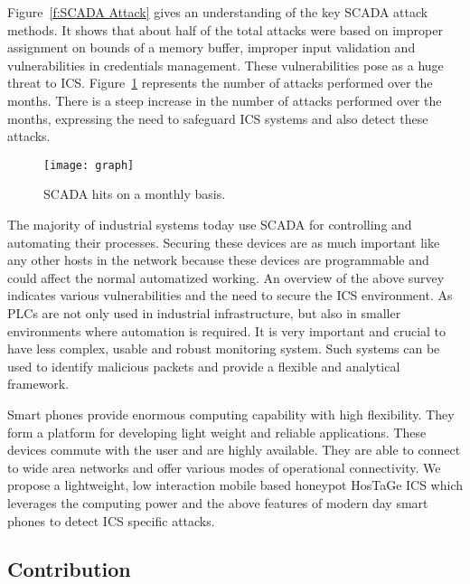 \documentclass[article,msc=informatik,type=msc,colorback,accentcolor=tud9c]{tudthesis}
\begin{document}
            
   \vspace{3mm}         
   Figure~\ref{f:SCADA Attack} gives an understanding of the key \ac{SCADA} attack methods. It shows that about half of the total attacks were based on improper assignment on bounds of a memory buffer, improper input validation and vulnerabilities in credentials management. These vulnerabilities pose as a huge threat to \ac{ICS}. Figure~\ref{f:SCADA Hits} represents the number of attacks performed over the months. There is a steep increase in the number of attacks performed over the months, expressing the need to safeguard \ac{ICS} systems and also detect these attacks.
     
        \begin{figure}[ht]
           \centering
           \texttt{[image: graph]}
           \caption[SCADA Hits]{\label{f:SCADA Hits}SCADA hits on a monthly basis.\cite{DELLSecurityPoster2015}}
           \end{figure} 
     
      
   \vspace{3mm}   
   The majority of industrial systems today use \ac{SCADA} for controlling and automating their processes.
   Securing these devices are as much important like any other hosts in the network because these devices are programmable and could affect the normal automatized working. An overview of the above survey indicates various vulnerabilities and the need to secure the \ac{ICS} environment. As \ac{PLC}s are not only used in industrial infrastructure, but also in smaller environments where automation is required. It is very important and crucial to have less complex, usable and robust monitoring system. Such systems can be used to identify malicious packets and provide a flexible and analytical framework. 
   
   \vspace{3mm}
   Smart phones provide enormous computing capability with high flexibility.  They form a platform for developing light weight and reliable applications. These devices commute with the user and are highly available. They are able to connect to wide area networks and offer various modes of operational connectivity. We propose a lightweight, low interaction mobile based honeypot HosTaGe ICS which leverages the computing power and the above features of modern day smart phones to detect \ac{ICS} specific attacks. 
   
    
 
  
   \subsection{Contribution}\label{Contribution}
      
\end{document}
